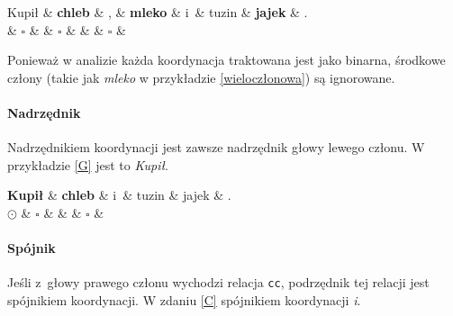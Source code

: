 \begin{exe}
\ex \label{wieloczłonowa}
\begin{dependency}[baseline=0.9ex]
\begin{deptext}[column sep=1em,  row sep=.1ex]
Kupił \& \textbf{chleb} \& , \& \textbf{mleko} \& i~\& tuzin \& \textbf{jajek} \& .  \\ 
 \& \textbf{$\square$} \& \& \textbf{$\square$} \& \& \& \textbf{$\square$} \& \\ 
\end{deptext}
\end{dependency}
\end{exe}

Ponieważ w analizie każda koordynacja traktowana jest jako binarna, środkowe człony (takie jak \textit{mleko} w przykładzie \eqref{wieloczłonowa}) są ignorowane.

\paragraph{Nadrzędnik}

Nadrzędnikiem koordynacji jest zawsze nadrzędnik głowy lewego członu. W przykładzie \eqref{G} jest to \textit{Kupił}.

\begin{exe}
\ex \label{G}
\begin{dependency}[baseline=0.9ex]
\begin{deptext}[column sep=1em, row sep=.1ex]
\textbf{Kupił} \& \textbf{chleb} \& i~\& tuzin \& jajek \& .  \\ 
\textbf{$\odot$} \& $\square$ \& \& \& $\square$ \& \\ 
\end{deptext}
\end{dependency}
\end{exe}

\paragraph{Spójnik}

Jeśli z~głowy prawego członu  wychodzi relacja \texttt{cc}, podrzędnik tej relacji jest spójnikiem koordynacji. W zdaniu \eqref{C} spójnikiem koordynacji \textit{i}.

